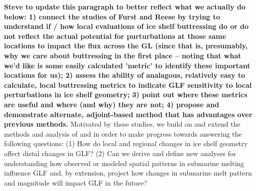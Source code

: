 \documentclass[review,oneside]{igs}
\begin{document}


\textbf{Steve to update this paragraph to better reflect what we actually do below: 1) connect the studies of Furst and Reese by trying to understand if / how local evaluations of ice shelf buttressing do or do not reflect the actual potential for purturbations at those same locations to impact the flux across the GL (since that is, presumably, why we care about buttressing in the first place -- noting that what we'd like is some easily calculated 'metric' to identify these important locations for us); 2) assess the ability of analagous, relatively easy to calculate, local buttressing metrics to indicate GLF sensitivity to local perturbations in ice shelf geometry; 3) point out where these metrics are useful and where (and why) they are not; 4) propose and demonstrate alternate, adjoint-based method that has advantages over previous methods.}
Motivated by these studies, we build on and extend the methods and analysis of \citet{furst2016} and \citet{reese2018} in order to make progress towards answering the following questions: 
(1) How do local and regional changes in ice shelf geometry affect distal changes in GLF? 
(2) Can we derive and define new analyses for understanding how observed or modeled spatial patterns in submarine melting influence GLF and, by extension, project how changes in submarine melt pattern and magnitude will impact GLF in the future?     
\end{document}

